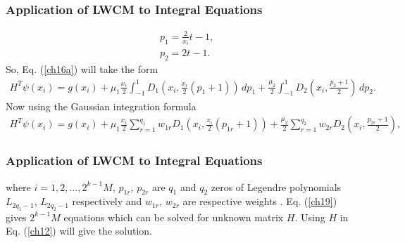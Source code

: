 \documentclass{beamer}
\begin{document}
\begin{frame}\frametitle{Application of LWCM to Integral Equations}
	\justifying
	\begin{align}
	&p_{1}=\frac{2}{x_{i}}t-1,\nonumber\\
	&p_{2}=2t-1.\nonumber
	\end{align}
	\small
	So, Eq. (\ref{ch16a}) will take the form
	\tiny
\begin{eqnarray}\label{ch17}
H^{T}\psi(x_{i}) = g(x_{i}) +\mu_{1}\frac{x_{i}}{2}\int^1_{-1} D_{1}\left(x_{i},\frac{x_{i}}{2}(p_{1}+1)\right)\,dp_{1} + \frac{\mu_{2}}{2}\int^1_{-1} D_{2}\left(x_{i},\frac{p_{2}+1}{2}\right)\,dp_{2}.
\end{eqnarray}
\small
Now using the Gaussian integration formula
\tiny
\begin{eqnarray}\label{ch19}
H^{T}\psi(x_{i}) = g(x_{i}) +\mu_{1}\frac{x_{i}}{2}\sum_{r=1}^{q_{1}}w_{1r} D_{1}\left(x_{i},\frac{x_{i}}{2}(p_{1r}+1)\right) + \frac{\mu_{2}}{2}\sum_{r=1}^{q_{2}}w_{2r} D_{2}\left(x_{i},\frac{p_{2r}+1}{2}\right),
\end{eqnarray}
\small
\end{frame}
\begin{frame}\frametitle{Application of LWCM to Integral Equations}
	\justifying
where $i=1, 2, ...,2^{k-1}M$, $p_{1r}$, $p_{2r}$ are $q_{1}$ and $q_{2}$ zeros of Legendre polynomials $L_{2q_{1}-1}$, $L_{2q_{2}-1}$ respectively and $w_{1r}$, $w_{2r}$ are respective weights \cite{Burden}.
Eq. (\ref{ch19}) gives $2^{k-1}M$ equations which can be solved for unknown matrix $H$. Using $H$ in Eq. (\ref{ch12}) will give the solution.
\end{frame}
\end{document}
